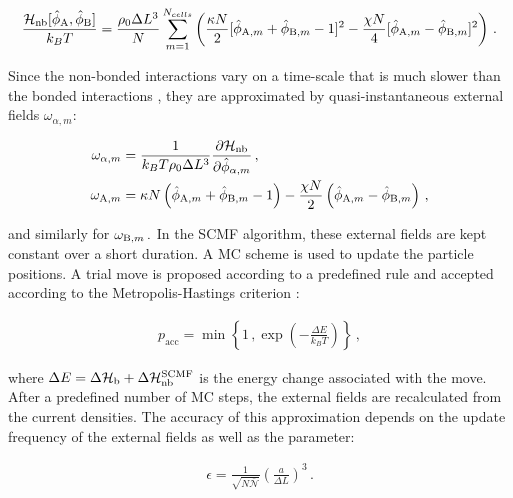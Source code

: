 \documentclass[bachelor,       %
               twoside,        %
               BCOR10mm,       %
               ngerman, english %
               ]{GAUBM}
\begin{document}
\begin{align}
    \frac{\mathcal H_\text{nb}[\hat\phi_\text A,\hat\phi_\text B]}{k_BT}=\frac{\rho_0\Delta L^3}{N}\sum_{m=1}^{N_{cells}}\left(\frac{\kappa N}{2}[\hat\phi_{\text A,m}+\hat\phi_{\text B,m}-1]^2-\frac{\chi N}{4}[\hat\phi_{\text A,m}-\hat\phi_{\text B,m}]^2\right)\,.
    \label{eq:nonbonded_discretized}
\end{align}

Since the non-bonded interactions vary on a time-scale that is much slower than the bonded interactions \cite{Daoulas06}, they are approximated by quasi-instantaneous external fields $\omega_{\alpha,m}$:

\begin{align}
    \omega_{\alpha,m}&=\frac{1}{k_BT\rho_0\Delta L^3}\frac{\partial \mathcal H_{\text{nb}}}{\partial \hat\phi_{\alpha,m}}\,,\nonumber \\
    \omega_{\text A,m}&=\kappa N\left(\hat\phi_{\text A,m}+\hat\phi_{\text B,m}-1\right)-\frac{\chi N}{2}\left(\hat\phi_{\text A,m}-\hat\phi_{\text B,m}\right)\,,
    \label{eq:calc_omegafields}
\end{align}

and similarly for $\omega_{\text B,m}\,.$ In the \ac{SCMF} algorithm, these external fields are kept constant over a short duration. A \ac{MC} scheme is used to update the particle positions. A trial move is proposed according to a predefined rule and accepted according to the Metropolis-Hastings criterion \cite{metropolis}:

\begin{align}
    p_{\text{acc}}=\min\left\{1\,,\exp\left(-\frac{\Delta E}{k_BT}\right)\right\}\,,
    \label{eq:metropolis_mc}
\end{align}

where $\Delta E=\Delta\mathcal H_{\text b}+\Delta\mathcal H_{\text{nb}}^{\text{SCMF}}$ is the energy change associated with the move. After a predefined number of \ac{MC} steps, the external fields are recalculated from the current densities. The accuracy of this approximation depends on the update frequency of the external fields as well as the parameter:

\begin{align}
    \epsilon =\frac{1}{\sqrt{N\bar{\mathcal N}}}\left(\frac{a}{\Delta L}\right)^3\,.
\end{align}



\end{document}
